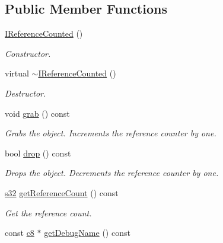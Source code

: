 \subsection*{Public Member Functions}
\begin{DoxyCompactItemize}
\item 
\mbox{\label{classirr_1_1IReferenceCounted_a8411682018e68a2752d4c82675c71040}} 
\hyperlink{classirr_1_1IReferenceCounted_a8411682018e68a2752d4c82675c71040}{I\+Reference\+Counted} ()
\begin{DoxyCompactList}\small\item\em Constructor. \end{DoxyCompactList}\item 
\mbox{\label{classirr_1_1IReferenceCounted_a78abc75801cbb13d9db0955b3c07251c}} 
virtual \hyperlink{classirr_1_1IReferenceCounted_a78abc75801cbb13d9db0955b3c07251c}{$\sim$\+I\+Reference\+Counted} ()
\begin{DoxyCompactList}\small\item\em Destructor. \end{DoxyCompactList}\item 
void \hyperlink{classirr_1_1IReferenceCounted_a396f9cdbe311ada278626477b3c6f0f5}{grab} () const
\begin{DoxyCompactList}\small\item\em Grabs the object. Increments the reference counter by one. \end{DoxyCompactList}\item 
bool \hyperlink{classirr_1_1IReferenceCounted_a03856a09355b89d178090c4a5f738543}{drop} () const
\begin{DoxyCompactList}\small\item\em Drops the object. Decrements the reference counter by one. \end{DoxyCompactList}\item 
\hyperlink{namespaceirr_ac66849b7a6ed16e30ebede579f9b47c6}{s32} \hyperlink{classirr_1_1IReferenceCounted_ae9836f102c33c68068e74292e0a01819}{get\+Reference\+Count} () const
\begin{DoxyCompactList}\small\item\em Get the reference count. \end{DoxyCompactList}\item 
const \hyperlink{namespaceirr_a9395eaea339bcb546b319e9c96bf7410}{c8} $\ast$ \hyperlink{classirr_1_1IReferenceCounted_ad336c6e3c975e4c7911a606c27b894f0}{get\+Debug\+Name} () const

\end{DoxyCompactItemize}
